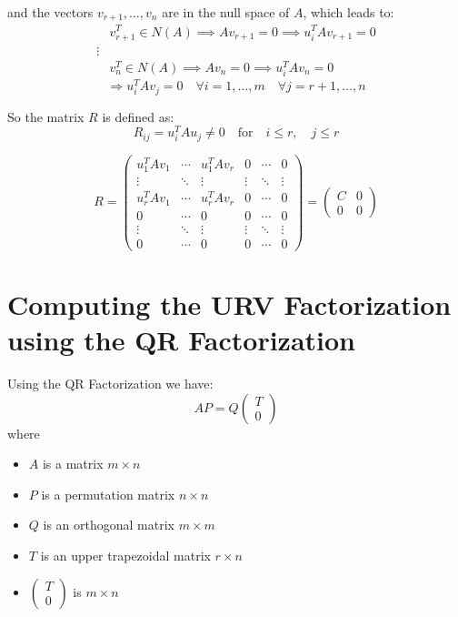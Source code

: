 and the vectors \( v_{r+1}, \ldots, v_n \) are in the null space of \( A \), which leads to:
\[
\begin{aligned}
&v_{r+1}^T \in N(A) \implies Av_{r+1} = 0 \implies u_i^T A v_{r+1} = 0 \\
\vdots \\
&v_n^T \in N(A) \implies Av_n = 0 \implies u_i^T A v_n = 0
\end{aligned}
\]
$$ \Rightarrow u_i^TAv_j = 0 \quad \forall i = 1, \dots, m \quad \forall j = r+1, \dots, n $$

So the matrix $R$ is defined as:
\[ R_{ij} = u_i^T A u_j \neq 0 \quad \text{for} \quad i \leq r, \quad j \leq r \]

\[
R = \begin{pmatrix}
u_1^T A v_1 & \cdots & u_1^T A v_r & 0 & \cdots & 0 \\
\vdots & \ddots & \vdots & \vdots & \ddots & \vdots \\
u_r^T A v_1 & \cdots & u_r^T A v_r & 0 & \cdots & 0 \\
0 & \cdots & 0 & 0 & \cdots & 0 \\
\vdots & \ddots & \vdots & \vdots & \ddots & \vdots \\
0 & \cdots & 0 & 0 & \cdots & 0
\end{pmatrix}
= \begin{pmatrix} C & 0 \\ 0 & 0 \end{pmatrix}
\]


\section{Computing the URV Factorization using the QR Factorization}
Using the QR Factorization we have:
\[ A P = Q \begin{pmatrix} T \\ 0 \end{pmatrix} \]
where
\begin{itemize}
    \item $A$ is a matrix $m \times n$
    \item $P$ is a permutation matrix $n \times n$
    \item $Q$ is an orthogonal matrix $m \times m$
    \item $T$ is an upper trapezoidal matrix $r \times n$
    \item $\begin{pmatrix} T \\ 0 \end{pmatrix}$ is $m \times n$
\end{itemize}


